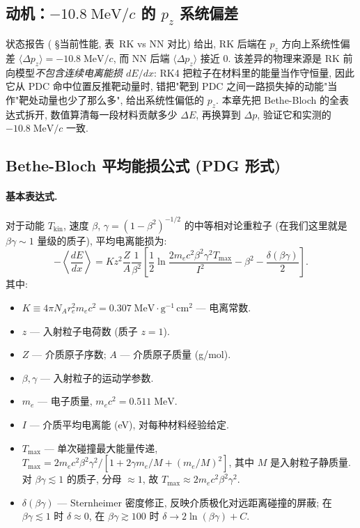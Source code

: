 \subsection{动机：$-10.8\;\mathrm{MeV}/c$ 的 $p_z$ 系统偏差}

状态报告 (\StatusReport{} §当前性能, 表~RK vs NN 对比) 给出, RK 后端在 $p_z$ 方向上系统性偏差 $\langle \Delta p_z \rangle = -10.8\;\mathrm{MeV}/c$, 而 NN 后端 $\langle \Delta p_z \rangle$ 接近 0. 该差异的物理来源是 RK 前向模型\emph{不包含连续电离能损 $dE/dx$}: RK4 把粒子在材料里的能量当作守恒量, 因此它从 PDC 命中位置反推靶动量时, 错把"靶到 PDC 之间一路损失掉的动能"当作"靶处动量也少了那么多", 给出系统性偏低的 $p_z$. 本章先把 Bethe-Bloch 的全表达式拆开, 数值算清每一段材料贡献多少 $\Delta E$, 再换算到 $\Delta p$, 验证它和实测的 $-10.8\;\mathrm{MeV}/c$ 一致.

\subsection{Bethe-Bloch 平均能损公式 (PDG 形式)}

\paragraph{基本表达式.} 对于动能 $T_\mathrm{kin}$, 速度 $\beta$, $\gamma = (1-\beta^2)^{-1/2}$ 的中等相对论重粒子 (在我们这里就是 $\beta\gamma \sim 1$ 量级的质子), 平均电离能损为:
\begin{equation}
  -\left\langle\frac{dE}{dx}\right\rangle
  = K z^2 \frac{Z}{A} \frac{1}{\beta^2}
  \left[
    \frac{1}{2}\ln\!\frac{2 m_e c^2 \beta^2 \gamma^2 T_\mathrm{max}}{I^2}
    - \beta^2
    - \frac{\delta(\beta\gamma)}{2}
  \right].
  \label{eq:partIc:bb_master}
\end{equation}
其中:
\begin{itemize}[nosep, leftmargin=2em]
  \item $K \equiv 4\pi N_A r_e^2 m_e c^2 = 0.307\;\mathrm{MeV \cdot g^{-1}\,cm^2}$ — 电离常数.
  \item $z$ — 入射粒子电荷数 (质子 $z=1$).
  \item $Z$ — 介质原子序数; $A$ — 介质原子质量 (g/mol).
  \item $\beta, \gamma$ — 入射粒子的运动学参数.
  \item $m_e$ — 电子质量, $m_e c^2 = 0.511\;\mathrm{MeV}$.
  \item $I$ — 介质平均电离能 (eV), 对每种材料经验给定.
  \item $T_\mathrm{max}$ — 单次碰撞最大能量传递, $T_\mathrm{max} = 2 m_e c^2 \beta^2 \gamma^2 / [1 + 2\gamma m_e/M + (m_e/M)^2]$, 其中 $M$ 是入射粒子静质量. 对 $\beta\gamma \lesssim 1$ 的质子, 分母 $\approx 1$, 故 $T_\mathrm{max} \approx 2 m_e c^2 \beta^2 \gamma^2$.
  \item $\delta(\beta\gamma)$ — Sternheimer 密度修正, 反映介质极化对远距离碰撞的屏蔽; 在 $\beta\gamma \lesssim 1$ 时 $\delta \approx 0$, 在 $\beta\gamma \gtrsim 100$ 时 $\delta \to 2\ln(\beta\gamma) + C$.
\end{itemize}

